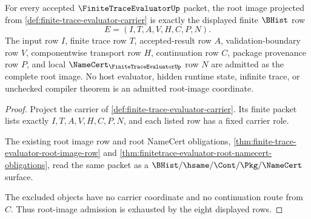 \begin{theorem}
\label{thm:finite-trace-evaluator-root-image-admission}
For every accepted $\FiniteTraceEvaluatorUp$ packet, the root image projected from \autoref{def:finite-trace-evaluator-carrier} is exactly the displayed finite $\BHist$ row
$$
E=(I,T,A,V,H,C,P,N).
$$
The input row $I$, finite trace row $T$, accepted-result row $A$, validation-boundary row $V$, componentwise transport row $H$, continuation row $C$, package provenance row $P$, and local $\NameCert_{\FiniteTraceEvaluatorUp}$ row $N$ are admitted as the complete root image. No host evaluator, hidden runtime state, infinite trace, or unchecked compiler theorem is an admitted root-image coordinate.
\end{theorem}
\begin{proof}
Project the carrier of \autoref{def:finite-trace-evaluator-carrier}. Its finite packet lists exactly $I,T,A,V,H,C,P,N$, and each listed row has a fixed carrier role.

The existing root image row and root NameCert obligations, \autoref{thm:finite-trace-evaluator-root-image-row} and \autoref{thm:finitetrace-evaluator-root-namecert-obligations}, read the same packet as a $\BHist/\hsame/\Cont/\Pkg/\NameCert$ surface.

The excluded objects have no carrier coordinate and no continuation route from $C$. Thus root-image admission is exhausted by the eight displayed rows.
\end{proof}

